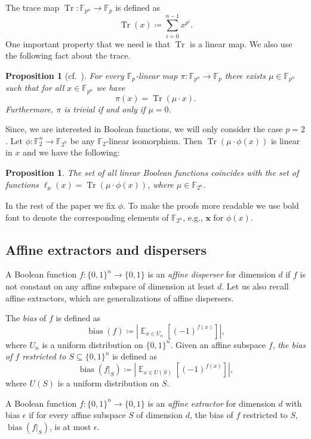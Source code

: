\documentclass[a4paper,11pt,draft]{article}
\newtheorem{proposition}[theorem]{Proposition}
\theoremstyle{definition}
\theoremstyle{remark}
\DeclareMathOperator{\Tr}{Tr}
\DeclareMathOperator{\bias}{bias}
\DeclareMathOperator{\E}{\mathbb{E}}
\newcommand{\card}[1]{{\left|#1\right|}}
\newcommand{\iso}[1]{\mathbf{#1}}
\newcommand{\Q}{{\{0,1\}}}
\newcommand{\bbF}{\mathbb{F}}
\newcommand{\restr}[2]{\left.#1\right|_{#2}}
\begin{document}
The trace map $\Tr\colon \bbF_{p^n} \to \bbF_p$ is defined as
\[
  \Tr(x) \coloneqq \sum_{i=0}^{n-1} x^{p^i}.
\]
One important property that we need is that $\Tr$ is a linear map. We also use the following fact about the trace.
\begin{proposition}[cf.~\cite{lidl_niederreiter_1996}]\label{prop:trace_linear}
  For every $\bbF_p$-linear map $\pi\colon \bbF_{p^n} \to \bbF_p$ there exists $\mu \in \bbF_{p^n}$ such that for all $x \in \bbF_{p^n}$ we have
  \[
    \pi(x) = \Tr(\mu \cdot x).
  \]
  Furthermore, $\pi$ is trivial if and only if $\mu = 0$.
\end{proposition}

Since, we are interested in Boolean functions, we will only consider the case $p=2$.
Let $\phi\colon \bbF_2^n \to \bbF_{2^n}$ be any $\bbF_2$-linear isomorphism. Then $\Tr(\mu \cdot \phi(x))$ is linear in $x$ and we have the following:
\begin{proposition}\label{prop:trace_linear_boolean}
  The set of all linear Boolean functions coincides with the set of functions $\ell_\mu(x) = \Tr(\mu \cdot \phi(x))$, where $\mu \in \bbF_{2^n}$.
\end{proposition}

In the rest of the paper we fix $\phi$. To make the proofs more readable we use bold font to denote the corresponding elements of $\bbF_{2^n}$, e.g., $\iso{x}$ for $\phi(x)$.

\subsection{Affine extractors and dispersers}
A Boolean function $f\colon \Q^n \to \Q$ is an \emph{affine disperser} for dimension $d$ if $f$ is not constant on any affine subspace of dimension at least $d$.
Let us also recall affine extractors, which are generalizations of affine dispersers.

The \emph{bias} of $f$ is defined as
\[
  \bias(f) \coloneqq \card{\E_{x \in U_n}[(-1)^{f(x)}]},
\]
where $U_n$ is a uniform distribution on $\Q^n$.
Given an affine subspace $f$, \emph{the bias of $f$ restricted to $S \subseteq \Q^n$} is defined as
\[
  \bias(\restr{f}{S}) \coloneqq \card{\E_{x \in U(S)}[(-1)^{f(x)}]},
\]
where $U(S)$ is a uniform distribution on $S$.

A Boolean function $f\colon \Q^n \to \Q$ is an \emph{affine extractor} for dimension $d$ with bias $\epsilon$ if for every affine subspace $S$ of dimension $d$, the bias of $f$ restricted to $S$, $\bias(\restr{f}{S})$, is at most $\epsilon$.
\end{document}
